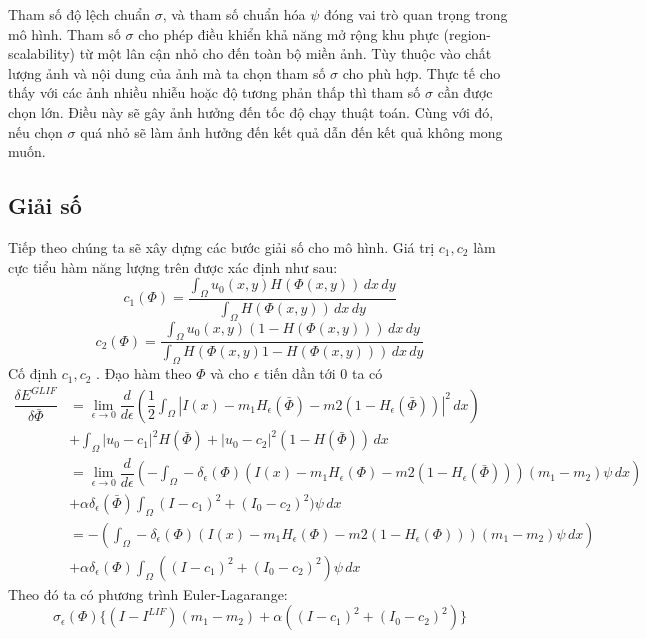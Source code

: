 \documentclass[12pt,oneside,a4]{report}
\begin{document}
Tham số độ lệch chuẩn $\sigma$, và tham số chuẩn hóa $\psi$ đóng vai trò quan trọng trong mô hình.  Tham số $\sigma$ cho phép điều khiển khả năng mở rộng khu phực (region-scalability) từ một lân cận nhỏ cho đến toàn bộ miền ảnh. Tùy thuộc vào chất lượng ảnh và nội dung của ảnh mà ta chọn tham số $\sigma$ cho phù hợp. Thực tế cho thấy với các ảnh nhiều nhiễu hoặc độ tương phản thấp thì tham số $\sigma$ cần được chọn lớn. Điều này sẽ gây  ảnh hưởng đến tốc độ chạy thuật toán. Cùng với đó, nếu chọn $\sigma$ quá nhỏ sẽ làm ảnh hưởng đến kết quả dẫn đến kết quả không mong muốn.
\subsection{Giải số}
Tiếp theo chúng ta sẽ xây dựng các bước giải số cho mô hình. Giá trị $c_1, c_2$ làm cực tiểu hàm năng lượng trên được xác định như sau:
\begin{equation}
c_1(\Phi)=\dfrac{\int_{\Omega}u_0(x,y)H(\Phi(x,y))\,dx \,dy}{\int_{\Omega}H(\Phi(x,y))\,dx\,dy}
\end{equation}
\begin{equation}
c_2(\Phi)=\dfrac{\int_{\Omega}u_0(x,y)(1-H(\Phi(x,y)))\,dx \,dy}{\int_{\Omega}H(\Phi(x,y)1-H(\Phi(x,y)))\,dx\,dy}
\end{equation}
Cố định $c_1, c_2$ . Đạo hàm theo $\Phi$ và cho $\epsilon$ tiến dần tới 0 ta có
\begin{equation}
\begin{split}
\dfrac{\delta E^{GLIF}}{\delta\bar{\Phi} } &=\lim_{\epsilon \rightarrow 0}\dfrac{d}{d \epsilon}(\dfrac{1}{2}\int_{\Omega}|I(x)-m_1H_{\epsilon}(\bar{\Phi})-m2(1-H_{\epsilon}(\bar{\Phi}))|^2\,dx) \\ 
&+\int_{\Omega} |u_0-c_1|^2H(\bar{\Phi})+ |u_0-c_2|^2(1-H(\bar{\Phi})) \,dx\\
&=\lim_{\epsilon \rightarrow 0}\dfrac{d}{d \epsilon}(-\int_{\Omega}-\delta_{\epsilon}(\Phi)(I(x)-m_1H_{\epsilon}(\Phi)-m2(1-H_{\epsilon}(\bar{\Phi})))(m_1-m_2)\psi\,dx) \\ 
&+\alpha\delta_{\epsilon}(\bar{\Phi})\int_{\Omega} (I-c_1)^2+ (I_0-c_2)^2)\psi \,dx\\
&=-(\int_{\Omega}-\delta_{\epsilon}(\Phi)(I(x)-m_1 H_{\epsilon}(\Phi)-m2(1-H_{\epsilon}(\Phi)))(m_1-m_2)\psi\,dx)\\
&+\alpha\delta_{\epsilon}(\Phi)\int_{\Omega} ((I-c_1)^2+ (I_0-c_2)^2)\psi \,dx
\end{split}
\end{equation}
Theo đó ta có phương trình Euler-Lagarange:
\begin{equation}
\sigma_{\epsilon}(\Phi)\{(I-I^{LIF})(m_1-m_2)+\alpha((I-c_1)^2+ (I_0-c_2)^2)\}
\end{equation}
\end{document}
